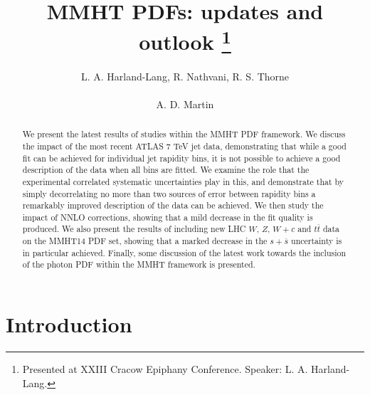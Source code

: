 \documentclass{appolb}
\begin{document}
\title{MMHT PDFs: updates and outlook
\thanks{Presented at XXIII Cracow Epiphany Conference. Speaker: L. A. Harland-Lang.}%
}
\author{L. A. Harland-Lang, R. Nathvani, R. S. Thorne
\address{Department of Physics and Astronomy, University College London, WC1E 6BT, UK}
\\
{A. D. Martin
}
\address{Institute for Particle Physics
  Phenomenology, Durham University, Durham DH1 3LE, UK}
}
\maketitle
\begin{abstract}
\noindent We present the latest results of studies within the MMHT PDF framework. We discuss the impact of the most recent ATLAS 7 TeV jet data, demonstrating that while a good fit can be achieved for individual jet rapidity bins, it is not possible to achieve a good description of the data when all bins are fitted. We examine the role that the experimental correlated systematic uncertainties play in this, and demonstrate that by simply decorrelating no more than two sources of error between rapidity bins a remarkably improved description of the data can be achieved. We then study the impact of NNLO corrections, showing that a mild decrease in the fit quality is produced. We also present the results of including new LHC $W$, $Z$, $W+c$ and $t\overline{t}$ data on the MMHT14 PDF set, showing that a marked decrease in the $s+\overline{s}$ uncertainty is in particular achieved. Finally, some discussion of the latest work towards the inclusion of the photon PDF within the MMHT framework is presented.

\end{abstract}
  
\section{Introduction}
\end{document}
